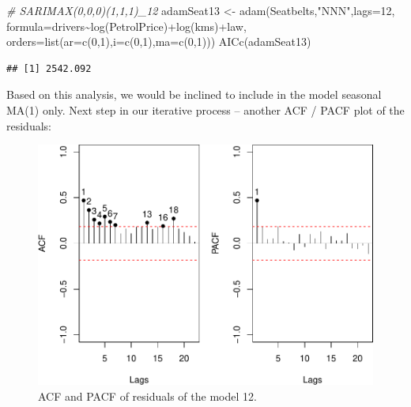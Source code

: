 \documentclass[
]{book}
\newenvironment{Shaded}{\begin{snugshade}}{\end{snugshade}}
\newcommand{\AttributeTok}[1]{\textcolor[rgb]{0.77,0.63,0.00}{#1}}
\newcommand{\CommentTok}[1]{\textcolor[rgb]{0.56,0.35,0.01}{\textit{#1}}}
\newcommand{\DecValTok}[1]{\textcolor[rgb]{0.00,0.00,0.81}{#1}}
\newcommand{\FunctionTok}[1]{\textcolor[rgb]{0.00,0.00,0.00}{#1}}
\newcommand{\NormalTok}[1]{#1}
\newcommand{\OtherTok}[1]{\textcolor[rgb]{0.56,0.35,0.01}{#1}}
\newcommand{\SpecialCharTok}[1]{\textcolor[rgb]{0.00,0.00,0.00}{#1}}
\newcommand{\StringTok}[1]{\textcolor[rgb]{0.31,0.60,0.02}{#1}}
\theoremstyle{definition}
\theoremstyle{definition}
\theoremstyle{definition}
\theoremstyle{definition}
\theoremstyle{remark}
\begin{document}
\begin{Shaded}
\begin{Highlighting}[]
\CommentTok{\# SARIMAX(0,0,0)(1,1,1)\_12}
\NormalTok{adamSeat13 }\OtherTok{\textless{}{-}} \FunctionTok{adam}\NormalTok{(Seatbelts,}\StringTok{"NNN"}\NormalTok{,}\AttributeTok{lags=}\DecValTok{12}\NormalTok{,}
                   \AttributeTok{formula=}\NormalTok{drivers}\SpecialCharTok{\textasciitilde{}}\FunctionTok{log}\NormalTok{(PetrolPrice)}\SpecialCharTok{+}\FunctionTok{log}\NormalTok{(kms)}\SpecialCharTok{+}\NormalTok{law,}
                   \AttributeTok{orders=}\FunctionTok{list}\NormalTok{(}\AttributeTok{ar=}\FunctionTok{c}\NormalTok{(}\DecValTok{0}\NormalTok{,}\DecValTok{1}\NormalTok{),}\AttributeTok{i=}\FunctionTok{c}\NormalTok{(}\DecValTok{0}\NormalTok{,}\DecValTok{1}\NormalTok{),}\AttributeTok{ma=}\FunctionTok{c}\NormalTok{(}\DecValTok{0}\NormalTok{,}\DecValTok{1}\NormalTok{)))}
\FunctionTok{AICc}\NormalTok{(adamSeat13)}
\end{Highlighting}
\end{Shaded}

\begin{verbatim}
## [1] 2542.092
\end{verbatim}

Based on this analysis, we would be inclined to include in the model seasonal MA(1) only. Next step in our iterative process -- another ACF / PACF plot of the residuals:

\begin{figure}
\centering
\includegraphics{Svetunkov--2022----ADAM_files/figure-latex/adamSeat13ACFPACF-1.pdf}
\caption{\label{fig:adamSeat13ACFPACF}ACF and PACF of residuals of the model 12.}
\end{figure}
\end{document}
